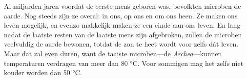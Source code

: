 \documentclass[12pt,a4paper]{article}
\begin{document}
Al miljarden jaren voordat de eerste mens geboren was, bevolkten microben de aarde. Nog steeds zijn ze overal: in ons, op ons en om ons heen. Ze maken ons leven mogelijk, en evenzo makkelijk maken ze een einde aan ons leven. En lang nadat de laatste resten van de laatste mens zijn afgebroken, zullen de microben veelvuldig de aarde bewonen, totdat de zon te heet wordt voor zelfs dàt leven. Maar dat zal even duren, want de taaiste microben—de \emph{Archea}—kunnen temperaturen verdragen van meer dan 80 °C. Voor sommigen mag het zelfs niet kouder worden dan 50 °C.

\end{document}
